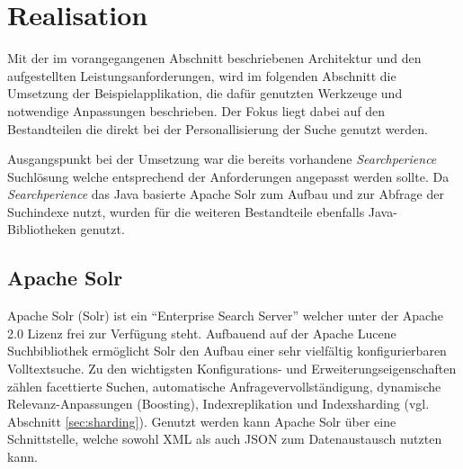 \section{Realisation}

Mit der im vorangegangenen Abschnitt beschriebenen Architektur und den aufgestellten Leistungsanforderungen, wird im folgenden Abschnitt die Umsetzung der Beispielapplikation, die dafür genutzten Werkzeuge und notwendige Anpassungen beschrieben. Der Fokus liegt dabei auf den Bestandteilen die direkt bei der Personallisierung der Suche genutzt werden.

Ausgangspunkt bei der Umsetzung war die bereits vorhandene \textit{Searchperience} Suchlösung welche entsprechend der Anforderungen angepasst werden sollte.
Da \textit{Searchperience} das Java basierte Apache Solr zum Aufbau und zur Abfrage der Suchindexe nutzt, wurden für die weiteren Bestandteile ebenfalls Java-Bibliotheken genutzt.

\subsection{Apache Solr}\label{sec:solr}

Apache Solr (Solr) ist ein ``Enterprise Search Server'' welcher unter der Apache 2.0 Lizenz frei zur Verfügung steht. Aufbauend auf der Apache Lucene Suchbibliothek ermöglicht Solr den Aufbau einer sehr vielfältig konfigurierbaren Volltextsuche. Zu den wichtigsten Konfigurations- und Erweiterungseigenschaften zählen facettierte Suchen, automatische Anfragevervollständigung, dynamische Relevanz-Anpassungen (Boosting), Indexreplikation und Indexsharding (vgl. Abschnitt \ref{sec:sharding}). Genutzt werden kann Apache Solr über eine  Schnittstelle, welche sowohl XML als auch \gls{JSON} zum Datenaustausch nutzten kann.

